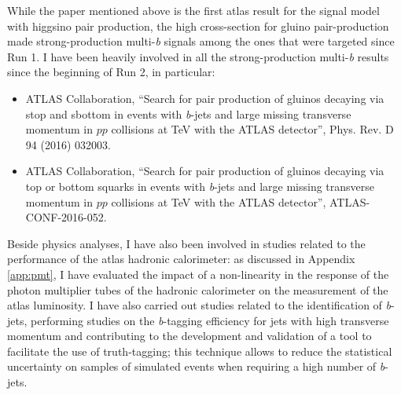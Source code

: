 While the paper mentioned above is the first \gls{atlas} result for the signal model with higgsino pair production, 
the high cross-section for gluino pair-production made strong-production multi-\textit{b} signals among the ones that were targeted since Run 1. 
I have been heavily involved in all the strong-production multi-\textit{b} results since the beginning of Run 2, in particular:

\begin{itemize}
\item ATLAS Collaboration, ``Search for pair production of gluinos decaying via stop and sbottom in events with \textit{b}-jets and large missing transverse momentum in $pp$ collisions at \cmtre TeV with the ATLAS detector'', Phys. Rev. D 94 (2016) 032003.
\item ATLAS Collaboration, ``Search for pair production of gluinos decaying via top or bottom squarks in events with \textit{b}-jets and large missing transverse momentum in
$pp$ collisions at \cmtre TeV with the ATLAS detector'', ATLAS-CONF-2016-052.
\end{itemize}

Beside physics analyses, I have also been involved in studies related to the performance of the \gls{atlas} hadronic calorimeter: 
as discussed in Appendix \ref{app:pmt}, I have evaluated the impact of a non-linearity in the response of the photon multiplier tubes of the 
hadronic calorimeter on the measurement of the \gls{atlas} luminosity. 
I have also carried out studies related to the identification of \textit{b}-jets, 
performing studies on the \textit{b}-tagging efficiency for jets with high transverse momentum and contributing to 
the development and validation of a tool to facilitate the use of truth-tagging; this technique 
allows to reduce the statistical uncertainty on samples of simulated events when requiring a high number of \textit{b}-jets. 


